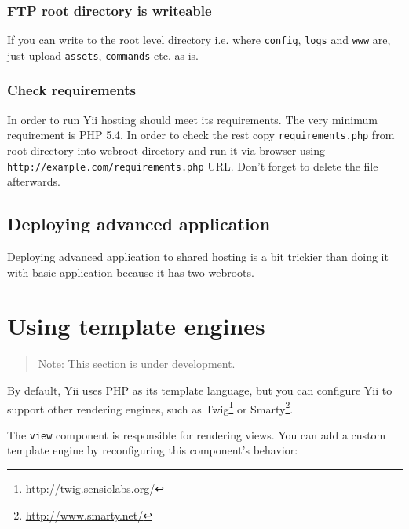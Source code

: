 \subsubsection{FTP root directory is writeable}
If you can write to the root level directory i.e. where \lstinline|config|, \lstinline|logs| and \lstinline|www| are, just upload \lstinline|assets|, \lstinline|commands|
etc. as is.

\subsubsection{Check requirements}
In order to run Yii hosting should meet its requirements. The very minimum requirement is PHP 5.4. In order to check
the rest copy \lstinline|requirements.php| from root directory into webroot directory and run it via browser using
\lstinline|http://example.com/requirements.php| URL. Don't forget to delete the file afterwards.

\subsection{Deploying advanced application}
Deploying advanced application to shared hosting is a bit trickier than doing it with basic application because it has
two webroots.



\label{tutorial-template-engines.md}\section{Using template engines}
\begin{quote}Note: This section is under development.

\end{quote}
By default, Yii uses PHP as its template language, but you can configure Yii to support other rendering engines, such as
Twig\footnote{\url{http://twig.sensiolabs.org/}} or Smarty\footnote{\url{http://www.smarty.net/}}.

The \lstinline|view| component is responsible for rendering views. You can add a custom template engine by reconfiguring this
component's behavior:


